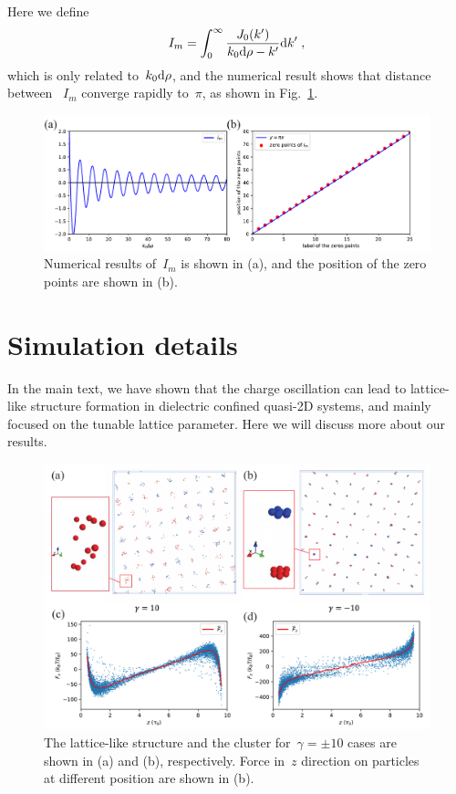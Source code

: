 Here we define
\begin{equation}
    I_{m} = \int_0^{\infty} \frac{J_0(k^\prime)}{k_0 \mathrm{d} \rho - k^\prime} \text{d}k^\prime\;,
\end{equation}
which is only related to~$k_0 \mathrm{d} \rho$, and the numerical result shows that distance between ~$I_{m}$ converge rapidly to~$\pi$, as shown in Fig.~\ref{fig:I_3}.

\begin{figure}[htbp]
\centering
\includegraphics[width=  \linewidth]{figs/I_3.pdf}
\caption{
    Numerical results of~$I_{m}$ is shown in (a), and the position of the zero points are shown in (b).
}
\label{fig:I_3}
\end{figure}


\section{Simulation details}

In the main text, we have shown that the charge oscillation can lead to lattice-like structure formation in dielectric confined quasi-2D systems, and mainly focused on the tunable lattice parameter.
Here we will discuss more about our results.

\begin{figure}[ht]
    \centering
    \includegraphics[width = \linewidth]{figs/MD_ball.pdf}
    \caption{The lattice-like structure and the cluster for~$\gamma = \pm 10$ cases are shown in (a) and (b), respectively. Force in~$z$ direction on particles at different position are shown in (b).}
    \label{fig:balls}
\end{figure}

